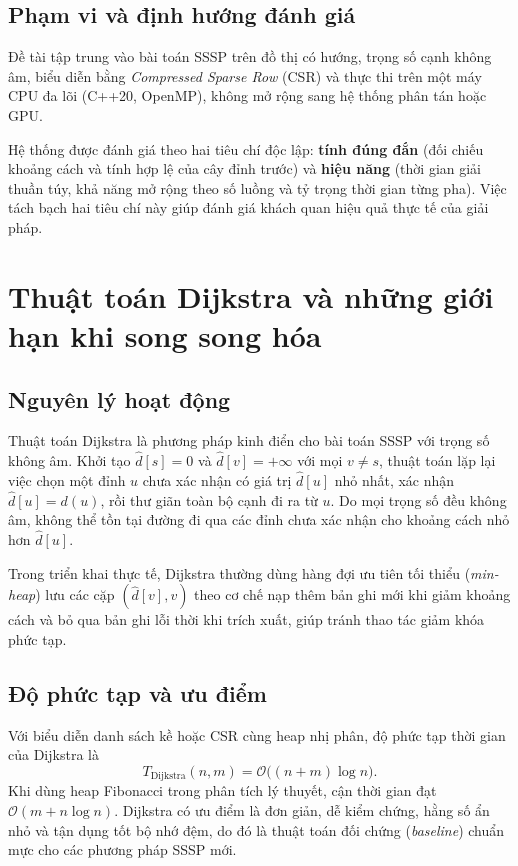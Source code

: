 \subsection{Phạm vi và định hướng đánh giá}

Đề tài tập trung vào bài toán SSSP trên đồ thị có hướng, trọng số cạnh không âm, biểu diễn bằng \textit{Compressed Sparse Row} (CSR) và thực thi trên một máy CPU đa lõi (C++20, OpenMP), không mở rộng sang hệ thống phân tán hoặc GPU.

Hệ thống được đánh giá theo hai tiêu chí độc lập: \textbf{tính đúng đắn} (đối chiếu khoảng cách và tính hợp lệ của cây đỉnh trước) và \textbf{hiệu năng} (thời gian giải thuần túy, khả năng mở rộng theo số luồng và tỷ trọng thời gian từng pha). Việc tách bạch hai tiêu chí này giúp đánh giá khách quan hiệu quả thực tế của giải pháp.

\section{Thuật toán Dijkstra và những giới hạn khi song song hóa}
\label{sec:dijkstra}

\subsection{Nguyên lý hoạt động}

Thuật toán Dijkstra \cite{dijkstra1959note} là phương pháp kinh điển cho bài toán SSSP với trọng số không âm. Khởi tạo $\widehat{d}[s]=0$ và $\widehat{d}[v]=+\infty$ với mọi $v\neq s$, thuật toán lặp lại việc chọn một đỉnh $u$ chưa xác nhận có giá trị $\widehat{d}[u]$ nhỏ nhất, xác nhận $\widehat{d}[u]=d(u)$, rồi thư giãn toàn bộ cạnh đi ra từ $u$. Do mọi trọng số đều không âm, không thể tồn tại đường đi qua các đỉnh chưa xác nhận cho khoảng cách nhỏ hơn $\widehat{d}[u]$.

Trong triển khai thực tế, Dijkstra thường dùng hàng đợi ưu tiên tối thiểu (\textit{min-heap}) lưu các cặp $(\widehat{d}[v], v)$ theo cơ chế nạp thêm bản ghi mới khi giảm khoảng cách và bỏ qua bản ghi lỗi thời khi trích xuất, giúp tránh thao tác giảm khóa phức tạp.

\subsection{Độ phức tạp và ưu điểm}

Với biểu diễn danh sách kề hoặc CSR cùng heap nhị phân, độ phức tạp thời gian của Dijkstra là \cite{cormen2022introduction}
\begin{equation}
    T_{\mathrm{Dijkstra}}(n,m) = \mathcal{O}\bigl((n+m)\log n\bigr).
    \label{eq:dijkstra-binary-heap}
\end{equation}
Khi dùng heap Fibonacci trong phân tích lý thuyết, cận thời gian đạt $\mathcal{O}(m + n\log n)$\cite{fredman1987fibonacci}. Dijkstra có ưu điểm là đơn giản, dễ kiểm chứng, hằng số ẩn nhỏ và tận dụng tốt bộ nhớ đệm, do đó là thuật toán đối chứng (\textit{baseline}) chuẩn mực cho các phương pháp SSSP mới\cite{haeupler2024universal}.

